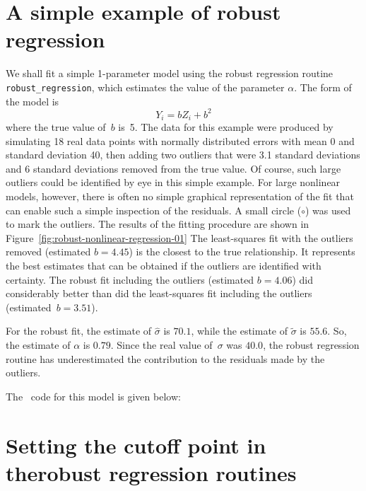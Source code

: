 \documentclass{admbmanual}
\begin{document}
\section{A simple example of robust regression}

 We shall fit a simple 1-parameter model
using the robust regression routine \texttt{robust\_regres\-sion}, which
estimates the value of the parameter $\alpha$. The form of the model is
\begin{equation*}
  Y_i=bZ_i+b^2
\end{equation*}
where the true value of~$b$ is~5. The data for this example were produced by
simulating 18 real data points with normally distributed errors with mean $0$
and standard deviation 40, then adding two outliers that were 3.1 standard
deviations and 6 standard deviations removed from the true value. Of course,
such large outliers could be identified by eye in this simple example. For large
nonlinear models, however, there is often no simple graphical representation of
the fit that can enable such a simple inspection of the residuals. A small
circle ($\circ$) was used to mark the outliers. The results of the fitting
procedure are shown in
Figure~\ref{fig:robust-nonlinear-regression-01} %
The least-squares fit with the outliers removed (estimated $b=4.45$) is the
closest to the true relationship. It represents the best estimates that can be
obtained if the outliers are identified with certainty. The robust fit including
the outliers (estimated $b=4.06$) did considerably better than did the
least-squares fit including the outliers (estimated~$b=3.51$).

For the robust fit, the estimate of $\hat\sigma$ is $70.1$, while the estimate
of $\tilde\sigma$ is $55.6$. So, the estimate of $\alpha$ is $0.79$. Since the
real value of~$\sigma$ was $40.0$, the robust regression routine has
underestimated the contribution to the residuals made by the outliers.

The \scAD\ code for this model is given below:






\section{Setting the cutoff point in the\br robust regression routines}
\label{sec:setting-cutoff}
\end{document}
